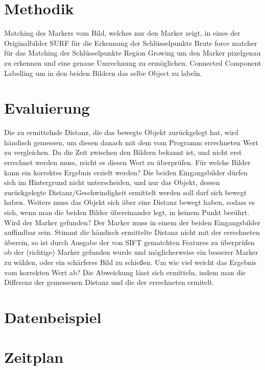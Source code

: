 \documentclass[deutsch]{scrartcl}
\begin{document}
\section{Methodik}
Matching des Markers vom Bild, welches nur den Marker zeigt, in eines der Originalbilder 
SURF für die Erkennung der Schlüsselpunkte
Brute force matcher für das Matching der Schlüsselpunkte
Region Growing um den Marker pixelgenau zu erkennen und eine genaue Umrechnung zu ermöglichen.
Connected Component Labelling um in den beiden Bildern das selbe Object zu labeln.

\section{Evaluierung}
Die zu ermittelnde Distanz, die das bewegte Objekt zurückgelegt hat, wird händisch gemessen, um diesen danach mit dem vom Programm errechneten Wert zu vergleichen. Da die Zeit zwischen den Bildern bekannt ist, und nicht erst errechnet werden muss, reicht es diesen Wert zu überprüfen.
Für welche Bilder kann ein korrektes Ergebnis erzielt werden? Die beiden Eingangsbilder dürfen sich im Hintergrund nicht unterscheiden, und nur das Objekt, dessen zurückgelegte Distanz/Geschwindigkeit ermittelt werden soll darf sich bewegt haben. Weiters muss das Objekt sich über eine Distanz bewegt haben, sodass es sich, wenn man die beiden Bilder übereinander legt, in keinem Punkt berührt.
Wird der Marker gefunden? Der Marker muss in einem der beiden Eingangsbilder auffindbar sein. Stimmt die händisch ermittelte Distanz nicht mit der errechneten überein, so ist durch Ausgabe der von SIFT gematchten Features zu überprüfen ob der (richtige) Marker gefunden wurde und möglicherweise ein besserer Marker zu wählen, oder ein schärferes Bild zu schießen.
Um wie viel weicht das Ergebnis vom korrekten Wert ab? Die Abweichung lässt sich ermitteln, indem man die Differenz der gemessenen Distanz und die der errechneten ermitelt.

\section{Datenbeispiel}


\section{Zeitplan}


\end{document}
